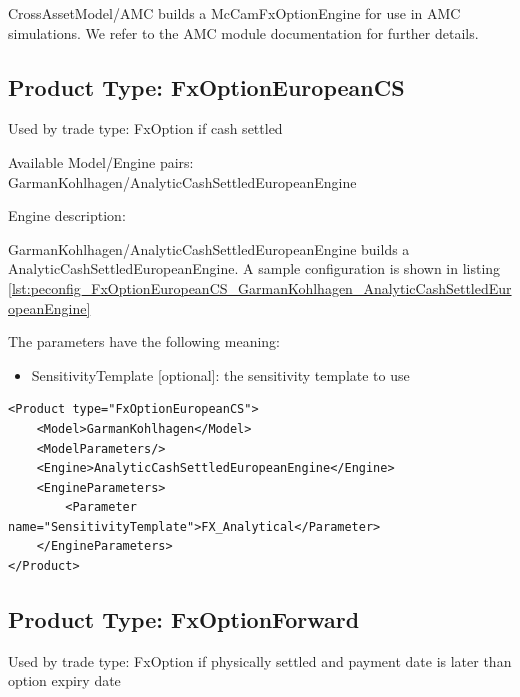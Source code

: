 CrossAssetModel/AMC builds a McCamFxOptionEngine for use in AMC simulations. We refer to the AMC module documentation
for further details.

\subsection{Product Type: FxOptionEuropeanCS}

Used by trade type: FxOption if cash settled

Available Model/Engine pairs: GarmanKohlhagen/AnalyticCashSettledEuropeanEngine

Engine description:

GarmanKohlhagen/AnalyticCashSettledEuropeanEngine builds a AnalyticCashSettledEuropeanEngine. A sample configuration is shown in listing
\ref{lst:peconfig_FxOptionEuropeanCS_GarmanKohlhagen_AnalyticCashSettledEuropeanEngine}

The parameters have the following meaning:

\begin{itemize}
\item SensitivityTemplate [optional]: the sensitivity template to use
\end{itemize}

\begin{longlisting}
\begin{verbatim}
<Product type="FxOptionEuropeanCS">
    <Model>GarmanKohlhagen</Model>
    <ModelParameters/>
    <Engine>AnalyticCashSettledEuropeanEngine</Engine>
    <EngineParameters>
        <Parameter name="SensitivityTemplate">FX_Analytical</Parameter>
    </EngineParameters>
</Product>
\end{verbatim}
\caption{Configuration for Product FxOptionEuropeanCS, Model GarmanKohlhagen, Engine AnalyticCashSettledEuropeanEngine}
\label{lst:peconfig_FxOptionEuropeanCS_GarmanKohlhagen_AnalyticCashSettledEuropeanEngine}
\end{longlisting}

\subsection{Product Type: FxOptionForward}

Used by trade type: FxOption if physically settled and payment date is later than option expiry date

